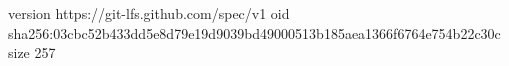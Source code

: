 version https://git-lfs.github.com/spec/v1
oid sha256:03cbc52b433dd5e8d79e19d9039bd49000513b185aea1366f6764e754b22c30c
size 257

